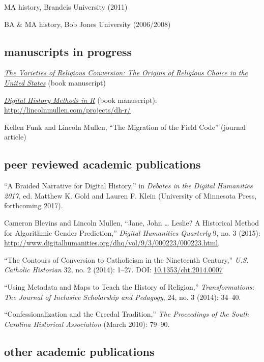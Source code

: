 \documentclass[11pt]{article}
\begin{document}
MA history, Brandeis University (2011)

BA \& MA history, Bob Jones University (2006/2008)

\subsection{manuscripts in 
  progress}\label{manuscripts-and-other-projects-in-progress}

\emph{\href{/research/\#varieties}{The Varieties of Religious
    Conversion: The Origins of Religious Choice in the United States}} (book 
manuscript)

\emph{\href{http://dh-r.lincolnmullen.com/}{Digital History Methods in
    R}} (book manuscript): \url{http://lincolnmullen.com/projects/dh-r/}

Kellen Funk and Lincoln Mullen, ``The Migration of the Field Code'' (journal 
article)

\subsection{peer reviewed academic publications}\label{peer-reviewed}

``A Braided Narrative for Digital History,'' in \emph{Debates in the Digital 
  Humanities 2017}, ed. Matthew K. Gold and Lauren F. Klein (University of 
Minnesota Press, forthcoming 2017).

Cameron Blevins and Lincoln Mullen, ``Jane, John \ldots{} Leslie? A
Historical Method for Algorithmic Gender Prediction,'' \emph{Digital
  Humanities Quarterly} 9, no. 3 (2015): 
\url{http://www.digitalhumanities.org/dhq/vol/9/3/000223/000223.html}.

``The Contours of Conversion to Catholicism in the Nineteenth Century,''
\emph{U.S. Catholic Historian} 32, no. 2 (2014): 1--27. DOI:
\href{http://dx.doi.org/10.1353/cht.2014.0007}{10.1353/cht.2014.0007}

``Using Metadata and Maps to Teach the History of Religion,''
\emph{Transformations: The Journal of Inclusive Scholarship and
  Pedagogy}, 24, no. 3 (2014): 34--40.

``Confessionalization and the Creedal Tradition,'' \emph{The Proceedings
  of the South Carolina Historical Association} (March 2010): 79--90.

\subsection{other academic publications}\label{other-academic}
\end{document}
